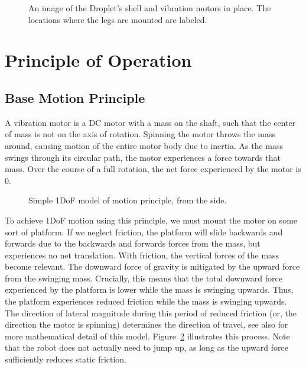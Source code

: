 \documentclass[letterpaper, 10pt, conference]{ieeeconf}
\begin{document}
\begin{figure}[h]
	\centering
	
	\caption{An image of the Droplet's shell and vibration motors in place. The locations where the legs are mounted are labeled.}
	\label{motorLocations}
\end{figure}



\section{Principle of Operation}

\subsection{Base Motion Principle}
A vibration motor is a DC motor with a mass on the shaft, such that the center of mass is not on the axis of rotation. Spinning the motor throws the mass around, causing motion of the entire motor body due to inertia. As the mass swings through its circular path, the motor experiences a force towards that mass. Over the course of a full rotation, the net force experienced by the motor is 0. 

\begin{figure}
\centering

\caption{Simple 1DoF model of motion principle, from the side.}
\label{motorDiagram}
\end{figure}

To achieve 1DoF motion using this principle, we must mount the motor on some sort of platform. If we neglect friction, the platform will slide backwards and forwards due to the backwards and forwards forces from the mass, but experiences no net translation. With friction, the vertical forces of the mass become relevant. The downward force of gravity is mitigated by the upward force from the swinging mass. Crucially, this means that the total downward force experienced by the platform is lower while the mass is swinging upwards. Thus, the platform experiences reduced friction while the mass is swinging upwards. The direction of lateral magnitude during this period of reduced friction (or, the direction the motor is spinning) determines the direction of travel, see also \cite{Vartholomeos2005,Vartholomeos2006} for more mathematical detail of this model. Figure~\ref{motorDiagram} illustrates this process. Note that the robot does not actually need to jump up, as long as the upward force sufficiently reduces static friction. 
\end{document}
